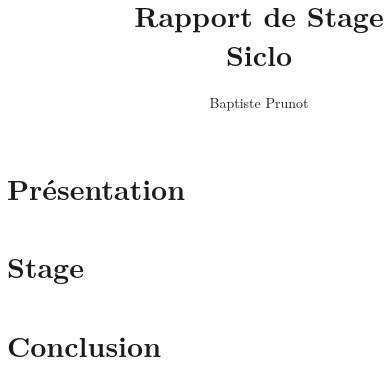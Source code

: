 \documentclass{report}
\author{Baptiste Prunot}
\title{Rapport de Stage\\Siclo}
\begin{document}
    \maketitle
    \tableofcontents
    \part{Présentation}
    \part{Stage}
    \part{Conclusion}
\end{document}
